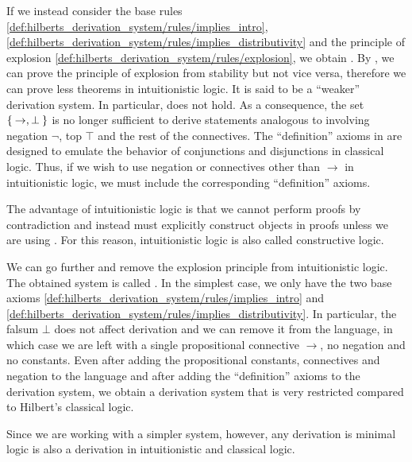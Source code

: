 \begin{remark}
\begin{RemEnum}
    If we instead consider the base rules \eqref{def:hilberts_derivation_system/rules/implies_intro}, \eqref{def:hilberts_derivation_system/rules/implies_distributivity} and the principle of explosion \eqref{def:hilberts_derivation_system/rules/explosion}, we obtain . By , we can prove the principle of explosion from stability but not vice versa, therefore we can prove less theorems in intuitionistic logic. It is said to be a \enquote{weaker} derivation system. In particular,  does not hold. As a consequence, the set \( \Set{ \rightarrow, \bot } \) is no longer sufficient to derive statements analogous to  involving negation \( \neg \), top \( \top \) and the rest of the connectives. The \enquote{definition} axioms in  are designed to emulate the behavior of conjunctions and disjunctions in classical logic. Thus, if we wish to use negation or connectives other than \( \rightarrow \) in intuitionistic logic, we must include the corresponding \enquote{definition} axioms.

    The advantage of intuitionistic logic is that we cannot perform proofs by contradiction and instead must explicitly construct objects in proofs unless we are using . For this reason, intuitionistic logic is also called constructive logic.

     We can go further and remove the explosion principle from intuitionistic logic. The obtained system is called . In the simplest case, we only have the two base axioms \eqref{def:hilberts_derivation_system/rules/implies_intro} and \eqref{def:hilberts_derivation_system/rules/implies_distributivity}. In particular, the falsum \( \bot \) does not affect derivation and we can remove it from the language, in which case we are left with a single propositional connective \( \rightarrow \), no negation and no constants. Even after adding the propositional constants, connectives and negation to the language and after adding the \enquote{definition} axioms to the derivation system, we obtain a derivation system that is very restricted compared to Hilbert's classical logic.

    Since we are working with a simpler system, however, any derivation is minimal logic is also a derivation in intuitionistic and classical logic.
  \end{RemEnum}
\end{remark}

